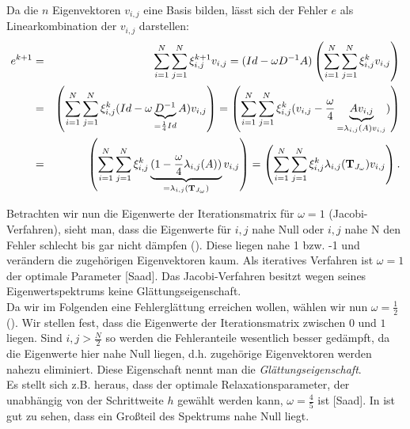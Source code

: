 Da die $n$ Eigenvektoren $v_{i,j}$ eine Basis bilden, lässt sich der Fehler $e$ als Linearkombination der $v_{i,j}$ darstellen:
\begin{eqnarray}
e^{k+1} &=& \sum_{i = 1}^{N} \sum_{j = 1}^{N} \xi^{k+1}_{i,j} v_{i,j} = (Id - \omega D^{-1}A) \left(\sum_{i = 1}^{N} \sum_{j = 1}^{N} \xi^{k}_{i,j} v_{i,j}\right) \notag \\
&=& \left(\sum_{i = 1}^{N} \sum_{j = 1}^{N} \xi^{k}_{i,j} (Id - \omega \underbrace{D^{-1}}_{=\frac{1}{4} Id} A) v_{i,j}\right) = \left(\sum_{i = 1}^{N} \sum_{j = 1}^{N} \xi^{k}_{i,j} (v_{i,j} - \frac {\omega} {4} \underbrace{A v_{i,j}}_{= \lambda_{i,j}(A)v_{i,j}})\right) \notag \\
&=& \left(\sum_{i = 1}^{N} \sum_{j = 1}^{N} \xi^{k}_{i,j} \underbrace{(1 - \frac {\omega} {4} \lambda_{i,j}(A))}_{= \lambda_{i,j}({\textbf{T}}_{J_{\omega}})} v_{i,j}\right) = \left(\sum_{i = 1}^{N} \sum_{j = 1}^{N} \xi^{k}_{i,j} \lambda_{i,j}({\textbf{T}}_{J_{\omega}}) v_{i,j}\right).
\end{eqnarray}

\label{img.Jacobi2}

Betrachten wir nun die Eigenwerte der Iterationsmatrix für $\omega = 1$ (Jacobi-Verfahren), sieht man, dass die Eigenwerte für $i,j$ nahe Null oder $i,j$ nahe N den Fehler schlecht bis gar nicht dämpfen (). Diese liegen nahe 1 bzw. -1 und verändern die zugehörigen Eigenvektoren kaum. Als iteratives Verfahren ist $\omega = 1$ der optimale Parameter [Saad]. Das Jacobi-Verfahren besitzt wegen seines Eigenwertspektrums keine Glättungseigenschaft.\\
Da wir im Folgenden eine Fehlerglättung erreichen wollen, wählen wir nun $\omega = \frac {1} {2}$ (). Wir stellen fest, dass die Eigenwerte der Iterationsmatrix zwischen $0$ und $1$ liegen. Sind $i,j > \frac {N} {2}$ so werden die Fehleranteile wesentlich besser gedämpft, da die Eigenwerte hier nahe Null liegen, d.h. zugehörige Eigenvektoren werden nahezu eliminiert. Diese Eigenschaft nennt man die \textit{Glättungseigenschaft}.\\
Es stellt sich z.B. heraus, dass der optimale Relaxationsparameter, der unabhängig von der Schrittweite $h$ gewählt werden kann, $\omega = \frac {4} {5}$ ist [Saad]. In  ist gut zu sehen, dass ein Großteil des Spektrums nahe Null liegt.

